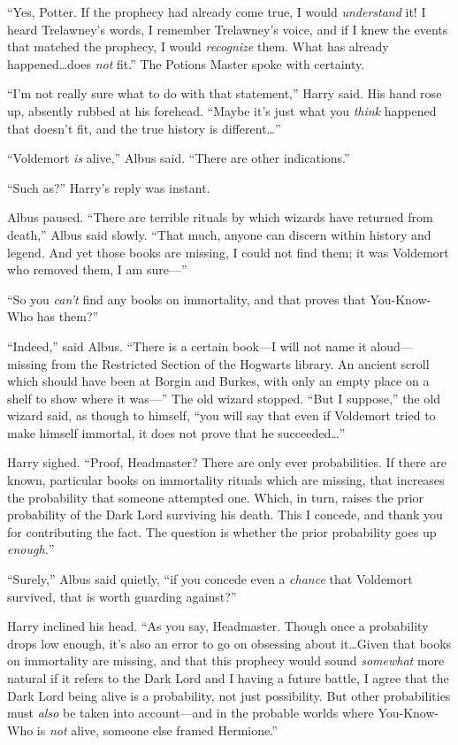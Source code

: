 “Yes, Potter. If the prophecy had already come true, I would \emph{understand} it! I heard Trelawney’s words, I remember Trelawney’s voice, and if I knew the events that matched the prophecy, I would \emph{recognize} them. What has already happened…does \emph{not} fit.” The Potions Master spoke with certainty.

“I’m not really sure what to do with that statement,” Harry said. His hand rose up, absently rubbed at his forehead. “Maybe it’s just what you \emph{think} happened that doesn’t fit, and the true history is different…”

“Voldemort \emph{is} alive,” Albus said. “There are other indications.”

“Such as?” Harry’s reply was instant.

Albus paused. “There are terrible rituals by which wizards have returned from death,” Albus said slowly. “That much, anyone can discern within history and legend. And yet those books are missing, I could not find them; it was Voldemort who removed them, I am sure—”

“So you \emph{can’t} find any books on immortality, and that proves that You-Know-Who has them?”

“Indeed,” said Albus. “There is a certain book—I will not name it aloud—missing from the Restricted Section of the Hogwarts library. An ancient scroll which should have been at Borgin and Burkes, with only an empty place on a shelf to show where it was—” The old wizard stopped. “But I suppose,” the old wizard said, as though to himself, “you will say that even if Voldemort tried to make himself immortal, it does not prove that he succeeded…”

Harry sighed. “Proof, Headmaster? There are only ever probabilities. If there are known, particular books on immortality rituals which are missing, that increases the probability that someone attempted one. Which, in turn, raises the prior probability of the Dark Lord surviving his death. This I concede, and thank you for contributing the fact. The question is whether the prior probability goes up \emph{enough.}”

“Surely,” Albus said quietly, “if you concede even a \emph{chance} that Voldemort survived, that is worth guarding against?”

Harry inclined his head. “As you say, Headmaster. Though once a probability drops low enough, it’s also an error to go on obsessing about it…Given that books on immortality are missing, and that this prophecy would sound \emph{somewhat} more natural if it refers to the Dark Lord and I having a future battle, I agree that the Dark Lord being alive is a probability, not just possibility. But other probabilities must \emph{also} be taken into account—and in the probable worlds where You-Know-Who is \emph{not} alive, someone else framed Hermione.”

